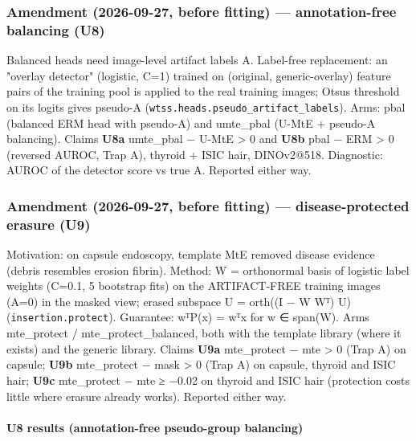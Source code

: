 {\subsubsection{Amendment (2026-09-27, before fitting) --- annotation-free balancing (U8)}\label{amendment-2026-09-27-before-fitting--annotation-free-balancing-u8}

Balanced heads need image-level artifact labels A. Label-free replacement: an "overlay detector" (logistic,
C=1) trained on (original, generic-overlay) feature pairs of the training pool is applied to the real training
images; Otsu\textquotesingle s threshold on its logits gives pseudo-A (\texttt{wtss.heads.pseudo\_artifact\_labels}).
Arms: pbal (balanced ERM head with pseudo-A) and umte\_pbal (U-MtE + pseudo-A balancing).
Claims \textbf{U8a} umte\_pbal − U-MtE \textgreater{} 0 and \textbf{U8b} pbal − ERM \textgreater{} 0 (reversed AUROC, Trap A), thyroid + ISIC hair,
DINOv2@518. Diagnostic: AUROC of the detector score vs true A. Reported either way.

\subsubsection{Amendment (2026-09-27, before fitting) --- disease-protected erasure (U9)}\label{amendment-2026-09-27-before-fitting--disease-protected-erasure-u9}

Motivation: on capsule endoscopy, template MtE removed disease evidence (debris resembles erosion fibrin).
Method: W = orthonormal basis of logistic label weights (C=0.1, 5 bootstrap fits) on the ARTIFACT-FREE training
images (A=0) in the masked view; erased subspace U\textquotesingle{} = orth((I − W Wᵀ) U) (\texttt{insertion.protect}). Guarantee:
wᵀP(x) = wᵀx for w ∈ span(W). Arms mte\_protect / mte\_protect\_balanced, both with the template library
(where it exists) and the generic library. Claims \textbf{U9a} mte\_protect − mte \textgreater{} 0 (Trap A) on capsule;
\textbf{U9b} mte\_protect − mask \textgreater{} 0 (Trap A) on capsule, thyroid and ISIC hair; \textbf{U9c} mte\_protect − mte ≥ −0.02 on
thyroid and ISIC hair (protection costs little where erasure already works). Reported either way.

\paragraph{U8 results (annotation-free pseudo-group balancing)}\label{u8-results-annotation-free-pseudo-group-balancing}

}
